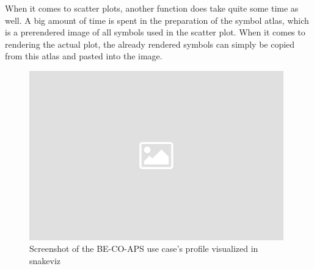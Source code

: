 When it comes to scatter plots, another function does take quite some time as
well. A big amount of time is spent in the preparation of the symbol atlas,
which is a prerendered image of all symbols used in the scatter plot. When it
comes to rendering the actual plot, the already rendered symbols can simply be
copied from this atlas and pasted into the image.


\begin{figure}[h]
    \centering
    \includegraphics[width=11cm]{resources/img/placeholder}
    \caption{
        Screenshot of the BE-CO-APS use case's profile visualized in snakeviz
    }
    \label{fig:application:aps:usecase:profile}
\end{figure}
